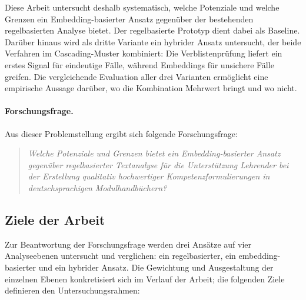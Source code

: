 Diese Arbeit untersucht deshalb systematisch, welche Potenziale und welche Grenzen ein Embedding-basierter Ansatz gegenüber der bestehenden regelbasierten Analyse bietet.
Der regelbasierte Prototyp dient dabei als Baseline.
Darüber hinaus wird als dritte Variante ein hybrider Ansatz untersucht, der beide Verfahren im Cascading-Muster kombiniert: Die Verblistenprüfung liefert ein erstes Signal für eindeutige Fälle, während Embeddings für unsichere Fälle greifen.
Die vergleichende Evaluation aller drei Varianten ermöglicht eine empirische Aussage darüber, wo die Kombination Mehrwert bringt und wo nicht.

\paragraph{Forschungsfrage.}
Aus dieser Problemstellung ergibt sich folgende Forschungsfrage:

\begin{quote}
\textit{Welche Potenziale und Grenzen bietet ein Embedding-basierter Ansatz gegenüber regelbasierter Textanalyse für die Unterstützung Lehrender bei der Erstellung qualitativ hochwertiger Kompetenzformulierungen in deutschsprachigen Modulhandbüchern?}
\end{quote}

%
\subsection{Ziele der Arbeit}\label{sec:ziele}

Zur Beantwortung der Forschungsfrage werden drei Ansätze auf vier Analyseebenen untersucht und verglichen: ein regelbasierter, ein embedding-basierter und ein hybrider Ansatz.
Die Gewichtung und Ausgestaltung der einzelnen Ebenen konkretisiert sich im Verlauf der Arbeit; die folgenden Ziele definieren den Untersuchungsrahmen:


